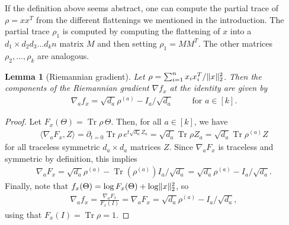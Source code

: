 \documentclass{article}
\newtheorem{lemma}[theorem]{Lemma}
\DeclarePairedDelimiter{\norm}{\lVert}{\rVert}
\newcommand\samp{x}
\newcommand\tr{\operatorname{Tr}}
\newcommand{\MW}[1]{{\color{red}[MW: #1]}}
\begin{document}
If the definition above seems abstract, one can compute the partial trace of $\rho = \samp \samp^T$ from the different flattenings we mentioned in the introduction. The partial trace $\rho_1$ is computed by computing the flattening of $\samp$ into a $d_1\times d_2 d_3 \dots d_k n$ matrix $M$ and then setting $\rho_1 = M M^T$. The other matrices $\rho_2, \dots, \rho_k$ are analogous.


\begin{lemma}[Riemannian gradient]\label{lem:gradient}
Let $\rho = \sum_{i=1}^n \samp_i \samp_i^T / \norm{\samp}_2^2$.
Then the components of the Riemannian gradient $\nabla f_{\samp}$ at the identity are given by
\begin{align*}
  \nabla_a f_{\samp} = \sqrt{d_a} \rho^{(a)} - I_a/\sqrt{d_a} \qquad \text{ for } a \in [k].
\end{align*}
\end{lemma}
\begin{proof}
  Let $F_{\samp}(\Theta) = \tr \rho \, \Theta$.
  Then, for all $a\in[k]$, we have
  \begin{align*}
   \langle \nabla_a F_{\samp} , Z \rangle
  = \partial_{t=0} \tr \rho \, e^{t \sqrt{d_a} Z_a}
  = \sqrt{d_a} \tr \rho Z_a
  = \sqrt{d_a} \tr \rho^{(a)} Z
  \end{align*}
  for all traceless symmetric $d_a \times d_a$ matrices $Z$.
  Since $\nabla_a F_{\samp}$ is traceless and symmetric by definition, this implies
  \begin{align*}
    \nabla_a F_{\samp}
  = \sqrt{d_a} \rho^{(a)} - \tr(\rho^{(a)}) I_a /\sqrt{d_a}
  = \sqrt{d_a} \rho^{(a)} - I_a/\sqrt{d_a}.
  \end{align*}
  Finally, note that $f_{\samp}(\Theta) = \log F_{\samp}(\Theta) + \log \norm{\samp}_2^2$, so
  \begin{align*}
    \nabla_a f_{\samp}
  = \frac{\nabla_a F_{\samp}}{F_{\samp}(I)}
  = \nabla_a F_{\samp}
  = \sqrt{d_a} \rho^{(a)} - I_a/\sqrt{d_a},
  \end{align*}
  using that $F_{\samp}(I) = \tr \rho = 1$.
\end{proof}
\end{document}
